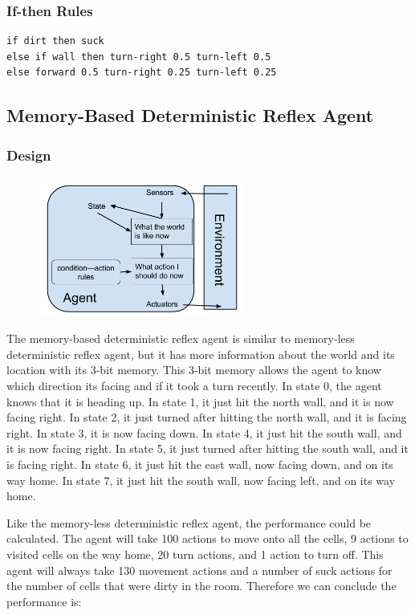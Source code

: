 \documentclass[a4paper,10pt]{article}
\begin{document}
\subsubsection{If-then Rules}
\begin{verbatim}
if dirt then suck
else if wall then turn-right 0.5 turn-left 0.5
else forward 0.5 turn-right 0.25 turn-left 0.25
\end{verbatim}


\subsection{Memory-Based Deterministic Reflex Agent}
\subsubsection{Design}
\begin{figure}[H]
	\begin{center}
		\includegraphics[width=0.6\textwidth]{MemoryReflex.png}
	\end{center}
\end{figure}

The memory-based deterministic reflex agent is similar to memory-less deterministic reflex agent, but it has more information about the world and its location with its 3-bit memory. 
This 3-bit memory allows the agent to know which direction its facing and if it took a turn recently.
In state 0, the agent knows that it is heading up.
In state 1, it just hit the north wall, and it is now facing right.
In state 2, it just turned after hitting the north wall, and it is facing right.
In state 3, it is now facing down. 
In state 4, it just hit the south wall, and it is now facing right.
In state 5, it just turned after hitting the south wall, and it is facing right.
In state 6, it just hit the east wall, now facing down, and on its way home.
In state 7, it just hit the south wall, now facing left, and on its way home.

Like the memory-less deterministic reflex agent, the performance could be calculated.
The agent will take 100 actions to move onto all the cells, 9 actions to visited cells on the way home, 20 turn actions, and 1 action to turn off. 
This agent will always take 130 movement actions and a number of suck actions for the number of cells that were dirty in the room. 
Therefore we can conclude the performance is:
\end{document}
